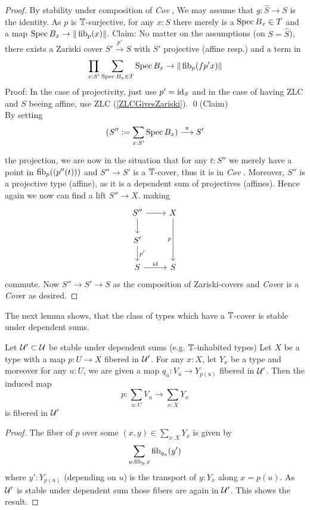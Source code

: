 \documentclass{article}
\newcommand{\Cov}{\emph{Cov} }
\newcommand{\Cover}{\emph{Cov}er }
\begin{document}
\begin{proof}
    By stability under composition of \Cov, We may assume that $g : \hat{S} \to S$ is the identity.
    As $p$ is $\mathbb{T}$-surjective, for any $x : S$ there merely is a $\operatorname{Spec} B_x \in T$  and a map $\operatorname{Spec} B_x \to \| \operatorname{fib}_p (x) \| $. 
    Claim: No matter on the assumptions (on $S = \hat{S}$), there exists a Zariski cover $S' \overset{p'}{\to} S$ with $S'$ projective (affine resp.) and a term in
    \[\prod_{x : S'} \sum_{\operatorname{Spec} B_x \in T} \operatorname{Spec} B_x \to \| \operatorname{fib}_p (fp' x)\| \]
    Proof: In the case of projectivity, just use $p' = \operatorname{id}_S$ and in the case of having ZLC and $S$ beeing affine, use ZLC (\ref{ZLCGivesZariski}). \qed(Claim)\\    
    By setting 
    \[(S'' := \sum_{x : S'} \operatorname{Spec} B_x) \overset{\pi}{\longrightarrow} S' \]
    
    the projection, we are now in the situation that for any $t : S''$ we merely have a point in $\operatorname{fib}_p((p''(t)))$ and $S'' \to S'$ is a $\mathbb{T}$-cover, thus it is in \Cov. Moreover, $S''$ is a projective type (affine), as it is a dependent sum of projectives (affines). Hence again we now can find a lift $S'' \to X$. %
    making
\[\begin{tikzcd}
	{S''} & X \\
	{S'} \\
	S & S
	\arrow[from=1-1, to=1-2]
	\arrow[from=1-1, to=2-1]
	\arrow["p"', from=1-2, to=3-2]
	\arrow["{p'}", from=2-1, to=3-1]
	\arrow["\id", from=3-1, to=3-2]
\end{tikzcd}\]
commute. Now $S'' \to S' \to S$ as the composition of Zariski-covers and \Cover is a \Cover \details as desired.
\end{proof}
The next lemma shows, that the class of types which have a $\mathbb{T}$-cover is stable under dependent sums.
\begin{lemma}{\label{lemma:AtlasSum}}
    Let $\mathcal{U}' \subset \mathcal{U}$ be stable under dependent sums (e.g. $\mathbb{T}$-inhabited types)
    Let $X$ be a type with a  map $p : U \to X$ fibered in $\mathcal{U}'$.  For any $x : X$, let $Y_x$ be a type and moreover for any $u : U$, we are given a map $q_u : V_u \to Y_{p(u)}$ fibered in $\mathcal{U}'$. Then the induced map
    \[
    p : \sum_{u : U} V_u \to \sum_{x : X} Y_{x}
    \]
    is fibered in $\mathcal{U}'$
\end{lemma}
\begin{proof}
    The fiber of $p$ over some $(x,y) \in \sum_{x :X} Y_x$ is given by
    \[
    \sum_{u : \operatorname{fib}_p x} \operatorname{fib}_{q_u} (y') 
    \]
    where $y' : Y_{p(u)}$ (depending on $u$) is the transport of $y : Y_x$ along $x = p(u)$. As $\mathcal{U}'$ is stable under dependent sum %
    those fibers are again in $\mathcal{U}'$. This shows the result.
\end{proof}
\end{document}

